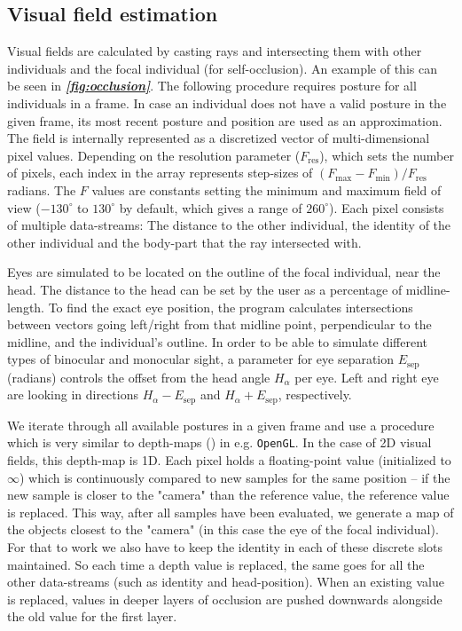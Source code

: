 \documentclass[9pt,lineno]{elife}
\newcommand{\figref}[1]{\textit{\textbf{\ref{#1}}}}
\begin{document}
\begin{appendixbox}
\section{Visual field estimation} \label{sec:visual_field}

Visual fields are calculated by casting rays and intersecting them with other individuals and the focal individual (for self-occlusion). An example of this can be seen in \figref{fig:occlusion}. The following procedure requires posture for all individuals in a frame. In case an individual does not have a valid posture in the given frame, its most recent posture and position are used as an approximation. The field is internally represented as a discretized vector of multi-dimensional pixel values. Depending on the resolution parameter ($F_\mathrm{res}$), which sets the number of pixels, each index in the array represents step-sizes of $(F_\mathrm{max} - F_\mathrm{min}) / F_\mathrm{res}$ radians. The $F$ values are constants setting the minimum and maximum field of view ($-130
^\circ$ to $130^\circ$ by default, which gives a range of $260^\circ$). Each pixel consists of multiple data-streams: The distance to the other individual, the identity of the other individual and the body-part that the ray intersected with.

Eyes are simulated to be located on the outline of the focal individual, near the head. The distance to the head can be set by the user as a percentage of midline-length. To find the exact eye position, the program calculates intersections between vectors going left/right from that midline point, perpendicular to the midline, and the individual's outline. In order to be able to simulate different types of binocular and monocular sight, a parameter for eye separation $E_\mathrm{sep}$ (radians) controls the offset from the head angle $H_\alpha$ per eye. Left and right eye are looking in directions $H_\alpha - E_\mathrm{sep}$ and $H_\alpha + E_\mathrm{sep}$, respectively.

We iterate through all available postures in a given frame and use a procedure which is very similar to depth-maps (\cite{williams1978casting}) in e.g. \texttt{OpenGL}. In the case of 2D visual fields, this depth-map is 1D. Each pixel holds a floating-point value (initialized to $\infty$) which is continuously compared to new samples for the same position -- if the new sample is closer to the "camera" than the reference value, the reference value is replaced. This way, after all samples have been evaluated, we generate a map of the objects closest to the "camera" (in this case the eye of the focal individual). For that to work we also have to keep the identity in each of these discrete slots maintained. So each time a depth value is replaced, the same goes for all the other data-streams (such as identity and head-position). When an existing value is replaced, values in deeper layers of occlusion are pushed downwards alongside the old value for the first layer.


\end{appendixbox}
\end{document}
